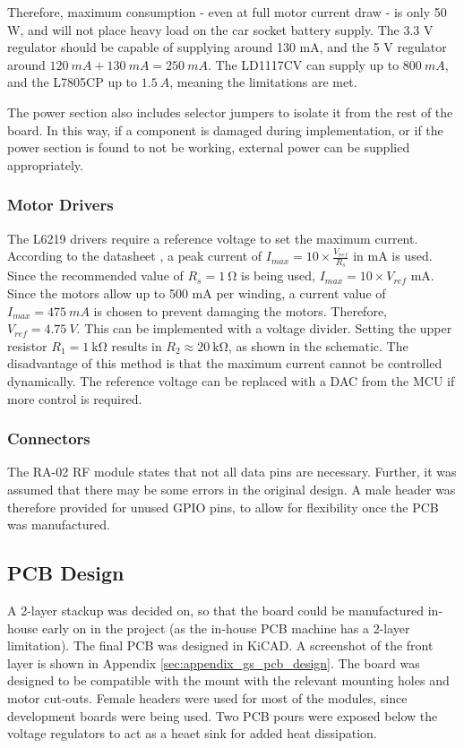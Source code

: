 Therefore, maximum consumption - even at full motor current draw - is only 50 W, and will not place heavy load on the car socket battery supply. The 3.3 V regulator should be capable of supplying around 130 mA, and the 5 V regulator around $\SI{120}{mA} + \SI{130}{mA} = \SI{250}{mA}$. The LD1117CV can supply up to $\SI{800}{mA}$, and the L7805CP up to $\SI{1.5}{A}$, meaning the limitations are met.

The power section also includes selector jumpers to isolate it from the rest of the board. In this way, if a component is damaged during implementation, or if the power section is found to not be working, external power can be supplied appropriately.

\subsubsection{Motor Drivers}
The L6219 drivers require a reference voltage to set the maximum current. According to the datasheet \cite{datasheet-L6219}, a peak current of $I_{max} = 10 \times \frac{V_{ref}}{R_s}$ in mA is used. Since the recommended value of $R_s = \SI{1}{\ohm}$ is being used, $I_{max} = 10 \times V_{ref}$ mA. Since the motors allow up to 500 mA per winding, a current value of $I_{max} = \SI{475}{mA}$ is chosen to prevent damaging the motors. Therefore, $V_{ref} = \SI{4.75}{V}$. This can be implemented with a voltage divider. Setting the upper resistor $R_1 = \SI{1}{\kilo \ohm}$ results in $R_2 \approx \SI{20}{\kilo \ohm}$, as shown in the schematic. The disadvantage of this method is that the maximum current cannot be controlled dynamically. The reference voltage can be replaced with a DAC from the MCU if more control is required.

\subsubsection{Connectors}
The RA-02 RF module states that not all data pins are necessary. Further, it was assumed that there may be some errors in the original design. A male header was therefore provided for unused GPIO pins, to allow for flexibility once the PCB was manufactured.

\subsection{PCB Design}
A 2-layer stackup was decided on, so that the board could be manufactured in-house early on in the project (as the in-house PCB machine has a 2-layer limitation). The final PCB was designed in KiCAD. A screenshot of the front layer is shown in Appendix \ref{sec:appendix_gs_pcb_design}. The board was designed to be compatible with the mount with the relevant mounting holes and motor cut-outs. Female headers were used for most of the modules, since development boards were being used. Two PCB pours were exposed below the voltage regulators to act as a heaet sink for added heat dissipation.